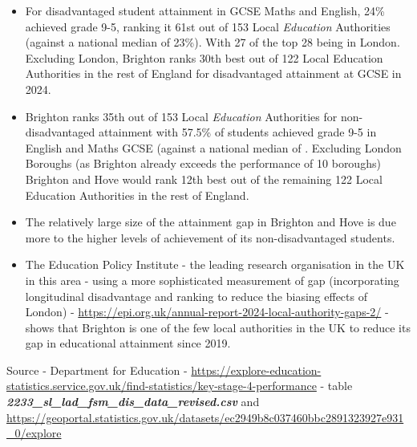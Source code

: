 \documentclass[
  letterpaper,
  DIV=11,
  numbers=noendperiod]{scrartcl}
\begin{document}
\begin{itemize}
\item
  For disadvantaged student attainment in GCSE Maths and English, 24\%
  achieved grade 9-5, ranking it 61st out of 153 Local \emph{Education}
  Authorities (against a national median of 23\%). With 27 of the top 28
  being in London. Excluding London, Brighton ranks 30th best out of 122
  Local Education Authorities in the rest of England for disadvantaged
  attainment at GCSE in 2024.
\item
  Brighton ranks 35th out of 153 Local \emph{Education} Authorities for
  non-disadvantaged attainment with 57.5\% of students achieved grade
  9-5 in English and Maths GCSE (against a national median of .
  Excluding London Boroughs (as Brighton already exceeds the performance
  of 10 boroughs) Brighton and Hove would rank 12th best out of the
  remaining 122 Local Education Authorities in the rest of England.
\item
  The relatively large size of the attainment gap in Brighton and Hove
  is due more to the higher levels of achievement of its
  non-disadvantaged students.
\item
  The Education Policy Institute - the leading research organisation in
  the UK in this area - using a more sophisticated measurement of gap
  (incorporating longitudinal disadvantage and ranking to reduce the
  biasing effects of London) -
  \url{https://epi.org.uk/annual-report-2024-local-authority-gaps-2/} -
  shows that Brighton is one of the few local authorities in the UK to
  reduce its gap in educational attainment since 2019.
\end{itemize}

Source - Department for Education -
\url{https://explore-education-statistics.service.gov.uk/find-statistics/key-stage-4-performance}
- table \textbf{\emph{2233\_sl\_lad\_fsm\_dis\_data\_revised.csv}} and
\url{https://geoportal.statistics.gov.uk/datasets/ec2949b8c037460bbc2891323927e931_0/explore}

\hypertarget{section}{%
\subsubsection{}\label{section}}
\end{document}

